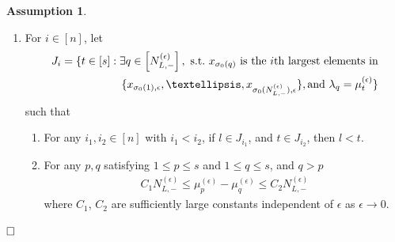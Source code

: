 \documentclass[11pt]{amsart}
\theoremstyle{plain}
\theoremstyle{definition}
\newtheorem{assumption}[theorem]{Assumption}
\theoremstyle{remark}
\newcommand\si{\sigma}
\renewcommand\ell{l}
\numberwithin{equation}{section}
\numberwithin{theorem}{section}
\numberwithin{figure}{section}
\begin{document}
\begin{assumption}
\begin{enumerate}
\begin{eqnarray*}
\end{eqnarray*}
 \item For $i\in[n]$, let 
\begin{eqnarray}
\label{ji}J_{i}=\{t\in[s]:\exists q\in\left[N_{L,-}^{(\epsilon)}\right],\ \mathrm{s.t.}\ x_{\sigma_0(q)}\ \mathrm{is\ the}\ i\mathrm{th\ largest\ elements\ in}\\\{x_{\si_0(1),\epsilon},\ldots,x_{\si_0(N_{L,-}^{(\epsilon)}),\epsilon}\},
\mathrm{and}\ \lambda_q=\mu_t^{(\epsilon)}\}\notag
\end{eqnarray}
such that
\begin{enumerate}
\item For any $i_1,i_2\in[n]$ with $i_1<i_2$, 
if $\ell\in J_{i_1}$, and $t\in J_{i_2}$, then $\ell<t$.
\item For any $p,q$ satisfying $1\leq p\leq s$ and $1\leq q\leq s$, and $q>p$
\begin{eqnarray*}
C_1N_{L,-}^{(\epsilon)} \leq \mu_p^{(\epsilon)}-\mu_q^{(\epsilon)}\leq C_2N_{L,-}^{(\epsilon)}
\end{eqnarray*}
where $C_1$, $C_2$ are sufficiently large constants independent of $\epsilon$ as $\epsilon\rightarrow 0$.
\end{enumerate}
\end{enumerate}$\hfill\Box$
\end{assumption}
\end{document}
